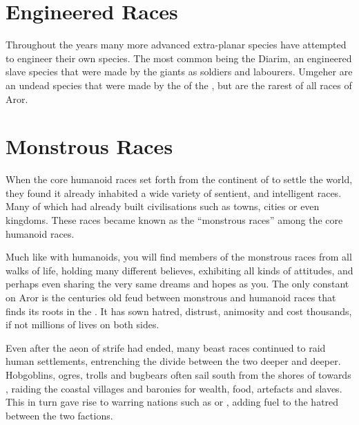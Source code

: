 





\section{Engineered Races}
\label{sec:Engineered Races}

Throughout the years many more advanced extra-planar species have attempted to
engineer their own species. The most common being the Diarim, an engineered
slave species that were made by the giants as soldiers and labourers. Umgeher
are an undead species that were made by the  of the
, but are the rarest of all races of Aror.





\section{Monstrous Races}
\label{sec:Monstrous Races}


When the core humanoid races set forth from the continent
of  to settle the world, they found it already inhabited a
wide variety of sentient, and intelligent races. Many of which had already
built civilisations such as towns, cities or even kingdoms. These races became
known as the ``monstrous races'' among the core humanoid races.

Much like with humanoids, you will find members of the monstrous races from
all walks of life, holding many different believes, exhibiting all kinds of
attitudes, and perhaps even sharing the very same dreams and hopes as you. The
only constant on Aror is the centuries old feud between monstrous and humanoid
races that finds its roots in the . It has sown hatred,
distrust, animosity and cost thousands, if not millions of lives on both
sides.

Even after the aeon of strife had ended, many beast races continued to raid
human settlements, entrenching the divide between the two deeper and deeper.
Hobgoblins, ogres, trolls and bugbears often sail south from the shores of
 towards , raiding the coastal
villages and baronies for wealth, food, artefacts and slaves. This in turn
gave rise to warring nations such as  or
, adding fuel to the hatred between the two factions.

